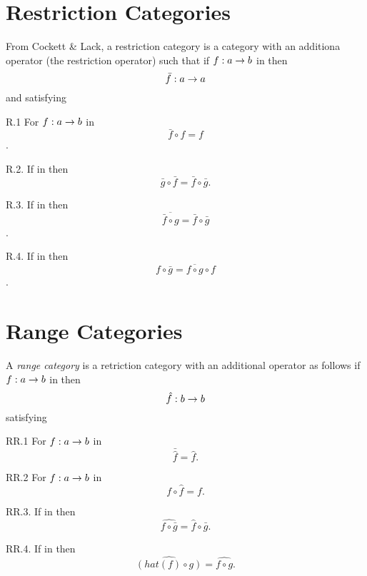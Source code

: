 \documentclass[10pt,a4paper]{article}
\theoremstyle{remark}
\renewcommand{\term}[1]{\textit{#1}}  %
\begin{document}
\iffalse
\newcommand{\fnsourceqnsource}
{
$
\begin{array}{c p{0.25cm} c  p{0.25cm} c }
             &&   \Rnode{b1}{b_1} &&              \\[0.4cm]
\Rnode{a}{a} &&                   && \Rnode{c}{c} \\[0.4cm]
             &&   \Rnode{bn}{b_n} &&              
\end{array} 
\begin{arrows}
\ncarr{a}{b1}
\alabel{f_1}
\ncarr{c}{b1}
\blabel{q_1} 
\ncarr{a}{bn}
\blabel{f_n}
\ncarr{c}{bn}
\alabel{q_n}
\end{arrows}
$   
}
\fi

\section{Restriction Categories}

From Cockett \& Lack, a restriction category is a category \catcw with an additiona operator (the restriction operator) such that
if $f: a \rightarrow b$ in \catcw then
$$\bar{f}: a \rightarrow a$$ 
and satisfying

R.1 For $f:a \rightarrow b$ in \catcw $$\bar{f} \circ f =f$$.

R.2. If \fgsourcediag in \catcw then
$$\bar{g} \circ \bar{f}=\bar{f} \circ \bar{g}.$$

R.3. If \fgsourcediag in \catcw then
$$\overline{\bar{f} \circ g} = \bar{f} \circ \bar{g}$$.

R.4. If  in \catcw then
$$f \circ \bar{g} = \overline{f \circ g} \circ f$$.

\section{Range Categories}

A \term{range category} is a retriction category with an additional operator as follows
if $f: a \rightarrow b$ in  \catcw then
$$\hat{f}: b \rightarrow b$$
satisfying

RR.1 For $f:a \rightarrow b$ in \catcw $$\bar{\hat{f}} = \hat{f}.$$

RR.2 For $f:a \rightarrow b$ in \catcw $$f \circ \hat{f} = f.$$

RR.3. If  in \catcw then
$$\widehat{f \circ \bar{g}} = \hat{f} \circ \bar{g}.$$

RR.4. If  in \catcw then
$$\widehat{(hat({f}) \circ g)} = \widehat{f \circ g}.$$
\end{document}
